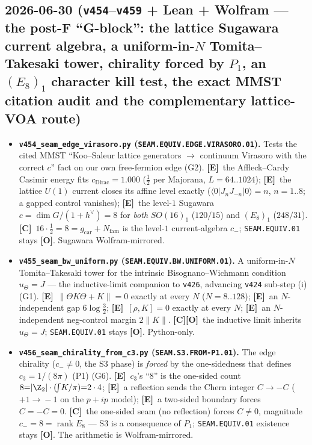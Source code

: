 \documentclass[11pt]{article}
\providecommand{\mE}{\textbf{[E]}}\providecommand{\mC}{\textbf{[C]}}
\providecommand{\mO}{\textbf{[O]}}\providecommand{\mX}{\textbf{[X]}}
\providecommand{\gcar}{g_{\mathrm{car}}}\providecommand{\Nfam}{N_{\mathrm{fam}}}
\begin{document}
\subsection*{2026-06-30 (\texttt{v454}--\texttt{v459} + Lean + Wolfram --- the post-F ``G-block'': the lattice Sugawara current algebra, a uniform-in-$N$ Tomita--Takesaki tower, chirality forced by $P_1$, an $(E_8)_1$ character kill test, the exact MMST citation audit and the complementary lattice-VOA route)}
\begin{itemize}
\item \textbf{\texttt{v454\_seam\_edge\_virasoro.py} (\texttt{SEAM.EQUIV.EDGE.VIRASORO.01}).} Tests the cited MMST
``Koo--Saleur lattice generators $\to$ continuum Virasoro with the correct $c$'' fact on our own free-fermion edge
(G2). \mE\ the Affleck--Cardy Casimir energy fits $c_{\mathrm{Dirac}}{=}1.000$ ($\tfrac12$ per Majorana, $L{=}64..1024$);
\mE\ the lattice $U(1)$ current closes its affine level exactly ($\langle0|J_nJ_{-n}|0\rangle{=}n$, $n{=}1..8$; a gapped
control vanishes); \mE\ the level-$1$ Sugawara $c{=}\dim G/(1{+}h^\vee){=}8$ for \emph{both} $SO(16)_1$ ($120/15$) and
$(E_8)_1$ ($248/31$). \mC\ $16{\cdot}\tfrac12{=}8{=}\gcar{+}\Nfam$ is the level-$1$ current-algebra $c_-$;
\texttt{SEAM.EQUIV.01} stays \mO. Sugawara Wolfram-mirrored.
\item \textbf{\texttt{v455\_seam\_bw\_uniform.py} (\texttt{SEAM.EQUIV.BW.UNIFORM.01}).} A uniform-in-$N$
Tomita--Takesaki tower for the intrinsic Bisognano--Wichmann condition $u_\Theta{=}J$ --- the inductive-limit companion
to \texttt{v426}, advancing \texttt{v424} sub-step (i) (G1). \mE\ $\|\Theta K\Theta{+}K\|{=}0$ exactly at every $N$
($N{=}8..128$); \mE\ an $N$-independent gap $6\log\tfrac32$; \mE\ $[\rho,K]{=}0$ exactly at every $N$; \mE\ an
$N$-independent neg-control margin $2\|K\|$. \mC\mO\ the inductive limit inherits $u_\Theta{=}J$;
\texttt{SEAM.EQUIV.01} stays \mO. Python-only.
\item \textbf{\texttt{v456\_seam\_chirality\_from\_c3.py} (\texttt{SEAM.S3.FROM-P1.01}).} The edge chirality
($c_-{\neq}0$, the S3 phase) is \emph{forced} by the one-sidedness that defines $c_3{=}1/(8\pi)$ (P1) (G6). \mE\
$c_3$'s ``$8$'' is the one-sided count $8{=}|\Z_2|\cdot(\!\int\!K/\pi){=}2\cdot4$; \mE\ a reflection sends the Chern
integer $C{\to}{-}C$ ($+1\!\to\!-1$ on the $p{+}ip$ model); \mE\ a two-sided boundary forces $C{=}{-}C{=}0$. \mC\ the
one-sided seam (no reflection) forces $C{\neq}0$, magnitude $c_-{=}8{=}\operatorname{rank}E_8$ --- S3 is a consequence
of $P_1$; \texttt{SEAM.EQUIV.01} existence stays \mO. The arithmetic is Wolfram-mirrored.

\end{itemize}
\end{document}
